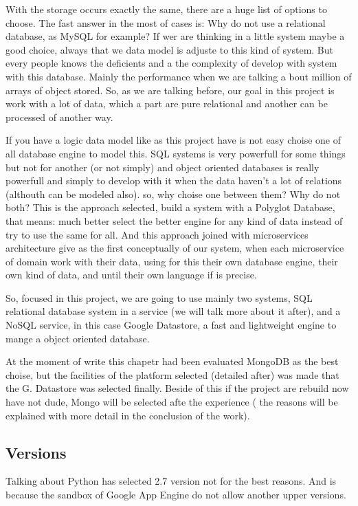 With the storage occurs exactly the same, there are a huge list of options to
choose. The fast answer in the most of cases is: Why do not use a relational
database, as MySQL for example? If wer are thinking in a little system maybe a
good choice, always that we data model is adjuste to this kind of system. But
every people  knows the deficients and a the complexity of develop with system
with this database. Mainly the performance when we are talking a bout million
of arrays of object stored. So, as we are talking before, our goal in this project
is work with a lot of data, which a part are pure relational and another can be
processed of another way.

If you have a logic data model like as this project have is not easy choise one
of all database engine to model this. SQL systems is very powerfull for some
things but not for another (or not simply) and object oriented databases is
really powerfull and simply to develop with it when the data haven't a lot of
relations (althouth can be modeled also).
so, why choise one between them? Why do not both? This is the approach selected,
build a system with a Polyglot Database, that means: much better select the better
engine for any kind of data instead of try to use the same for all.
And this approach joined with microservices architecture give as the first
conceptually of our system, when each microservice of domain work with their
data, using for this their own database engine, their own kind of data, and
until their own language if is precise.


So, focused in this project, we are going to use mainly two systems, SQL
relational database system in a service (we will talk more about it after),
and a NoSQL service, in this case Google Datastore, a fast and lightweight
engine to mange a object oriented database.

At the moment of write this chapetr had been evaluated MongoDB as the best
choise, but the facilities of the platform selected (detailed after) was made
that the G. Datastore was selected finally. Beside of this if the project are
rebuild now have not dude, Mongo will be selected afte the experience ( the
reasons will be explained with more detail in the conclusion of the work).

\subsection{Versions}

Talking about Python has selected 2.7 version not for the best reasons.
And is because the sandbox of Google App Engine do not allow another upper versions.

